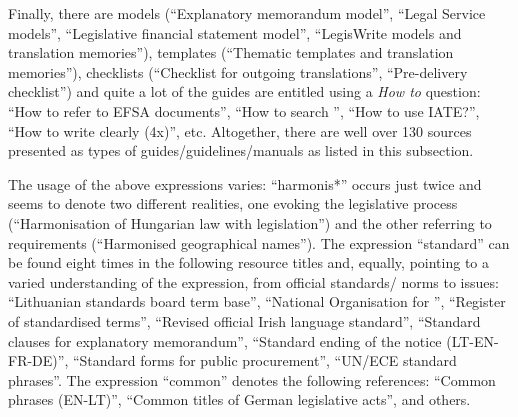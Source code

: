 \documentclass[output=paper]{langsci/langscibook}
\begin{document}
Finally, there are models (“Explanatory memorandum model”, “Legal Service models”, “Legislative financial statement model”, “LegisWrite models and translation memories”), templates (“Thematic templates and translation memories”), checklists (“Checklist for outgoing translations”, “Pre-delivery checklist”) and quite a lot of the guides are entitled using a \textit{How to} question: “How to refer to EFSA documents”, “How to search  ”, “How to use IATE?”, “How to write clearly (4x)”, etc. Altogether, there are well over 130 sources presented as types of guides/guidelines/manuals as listed in this subsection.


The usage of the above expressions varies: “harmonis*” occurs just twice and seems to denote two different realities, one evoking the legislative process (“Harmonisation of Hungarian law with  legislation”) and the other referring to  requirements (“Harmonised geographical names”). The expression “standard” can be found eight times in the following resource titles and, equally, pointing to a varied understanding of the expression, from official standards/ norms to  issues: “Lithuanian standards board term base”, “National Organisation for ”, “Register of standardised terms”, “Revised official Irish language standard”, “Standard clauses for explanatory memorandum”, “Standard ending of the notice (LT-EN-FR-DE)”, “Standard forms for public procurement”, “UN/ECE standard phrases”. The expression “common” denotes the following references: “Common phrases (EN-LT)”, “Common titles of German legislative acts”, and others.

\end{document}
